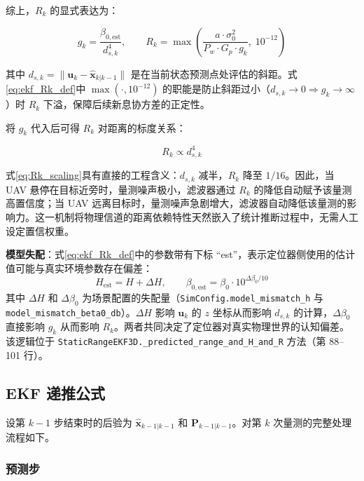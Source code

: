 综上，$R_k$ 的显式表达为：

\begin{equation}
g_k = \frac{\beta_{0,\text{est}}}{d_{s,k}^4}, \qquad
R_k = \max\!\left( \frac{a \cdot \sigma_0^2}{P_w \cdot G_p \cdot g_k},\; 10^{-12} \right)
\label{eq:ekf_Rk_def}
\end{equation}

其中 $d_{s,k} = \|\mathbf{u}_k - \hat{\mathbf{x}}_{k|k-1}\|$ 是在当前状态预测点处评估的斜距。式\eqref{eq:ekf_Rk_def}中 $\max(\cdot, 10^{-12})$ 的职能是防止斜距过小（$d_{s,k} \to 0 \Rightarrow g_k \to \infty$）时 $R_k$ 下溢，保障后续新息协方差的正定性。

将 $g_k$ 代入后可得 $R_k$ 对距离的标度关系：

\begin{equation}
R_k \propto d_{s,k}^4
\label{eq:Rk_scaling}
\end{equation}

式\eqref{eq:Rk_scaling}具有直接的工程含义：$d_{s,k}$ 减半，$R_k$ 降至 $1/16$。因此，当 UAV 悬停在目标近旁时，量测噪声极小，滤波器通过 $R_k$ 的降低自动赋予该量测高置信度；当 UAV 远离目标时，量测噪声急剧增大，滤波器自动降低该量测的影响力。这一机制将物理信道的距离依赖特性天然嵌入了统计推断过程中，无需人工设定置信权重。

\textbf{模型失配}：式\eqref{eq:ekf_Rk_def}中的参数带有下标 ``est''，表示定位器侧使用的估计值可能与真实环境参数存在偏差：
\begin{equation}
H_{\text{est}} = H + \Delta H, \qquad
\beta_{0,\text{est}} = \beta_0 \cdot 10^{\Delta\beta_0 / 10}
\label{eq:model_mismatch}
\end{equation}
其中 $\Delta H$ 和 $\Delta\beta_0$ 为场景配置的失配量（\texttt{SimConfig.model\_mismatch\_h} 与 \texttt{model\_mismatch\_beta0\_db}）。$\Delta H$ 影响 $\mathbf{u}_k$ 的 $z$ 坐标从而影响 $d_{s,k}$ 的计算，$\Delta\beta_0$ 直接影响 $g_k$ 从而影响 $R_k$。两者共同决定了定位器对真实物理世界的认知偏差。该逻辑位于 \texttt{StaticRangeEKF3D.\_predicted\_range\_and\_H\_and\_R} 方法（第 88--101 行）。

\subsection{EKF 递推公式}

设第 $k-1$ 步结束时的后验为 $\hat{\mathbf{x}}_{k-1|k-1}$ 和 $\mathbf{P}_{k-1|k-1}$。对第 $k$ 次量测的完整处理流程如下。

\subsubsection{预测步}

